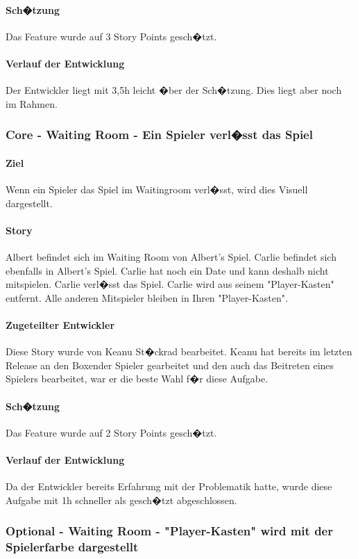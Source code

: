 \documentclass[12pt, titlepage]{scrartcl}
\begin{document}
			\paragraph{Sch�tzung}
			Das Feature wurde auf 3 Story Points gesch�tzt.
			\paragraph{Verlauf der Entwicklung} 
			Der Entwickler liegt mit 3,5h leicht �ber der Sch�tzung. Dies liegt aber noch im Rahmen.
			
			\subsubsection{Core - Waiting Room - Ein Spieler verl�sst das Spiel}
			\paragraph{Ziel} Wenn ein Spieler das Spiel im Waitingroom verl�sst, wird dies Visuell dargestellt.
			\paragraph{Story} Albert befindet sich im Waiting Room von Albert's Spiel. Carlie befindet sich ebenfalls in Albert's Spiel. Carlie hat noch ein Date und kann deshalb nicht mitspielen. Carlie verl�sst das Spiel. Carlie wird aus seinem "Player-Kasten" entfernt. Alle anderen Mitspieler bleiben in Ihren "Player-Kasten".
			\paragraph{Zugeteilter Entwickler} Diese Story wurde von Keanu St�ckrad bearbeitet. Keanu hat bereits im letzten Release an den \glqq Boxen\grqq der Spieler gearbeitet und den auch das Beitreten eines Spielers bearbeitet, war er die beste Wahl f�r diese Aufgabe.
			\paragraph{Sch�tzung}
			Das Feature wurde auf 2 Story Points gesch�tzt.
			\paragraph{Verlauf der Entwicklung} 
			Da der Entwickler bereits Erfahrung mit der Problematik hatte, wurde diese Aufgabe mit 1h schneller als gesch�tzt abgeschlossen.
			
			\subsubsection{Optional - Waiting Room - "Player-Kasten" wird mit der Spielerfarbe dargestellt}
\end{document}
